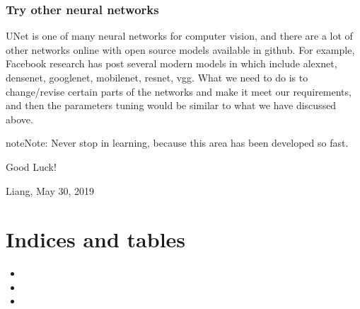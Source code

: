 \documentclass[letterpaper,10pt,english]{sphinxmanual}
\begin{document}
\subsection{Try other neural networks}
\label{\detokenize{usage/adjust:try-other-neural-networks}}
UNet is one of many neural networks for computer vision, and there are a lot of other networks online with open source models available in github. For example, Facebook research has post several modern models in  which include alexnet, densenet, googlenet, mobilenet, resnet, vgg. What we need to do is to change/revise certain parts of the networks and make it meet our requirements, and then the parameters tuning would be similar to what we have discussed above.

\begin{sphinxadmonition}{note}{Note:}
Never stop in learning, because this area has been developed so fast.
\end{sphinxadmonition}

Good Luck!

Liang, May 30, 2019


\chapter{Indices and tables}
\label{\detokenize{index:indices-and-tables}}\begin{itemize}
\item {} 

\item {} 

\item {} 

\end{itemize}



\renewcommand{\indexname}{Index}
\printindex
\end{document}
